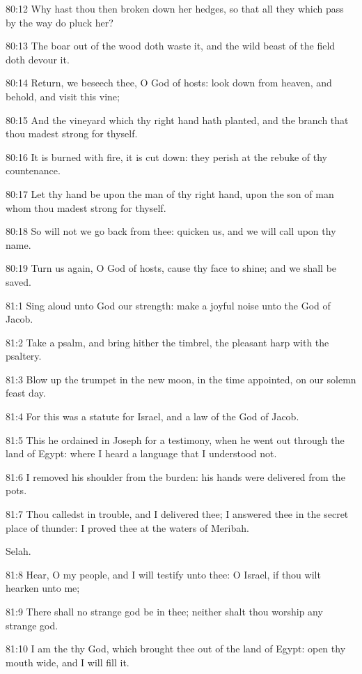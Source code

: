 80:12 Why hast thou then broken down her hedges, so that all they which pass by the way do pluck her?

80:13 The boar out of the wood doth waste it, and the wild beast of the field doth devour it.

80:14 Return, we beseech thee, O God of hosts: look down from heaven, and behold, and visit this vine;

80:15 And the vineyard which thy right hand hath planted, and the branch that thou madest strong for thyself.

80:16 It is burned with fire, it is cut down: they perish at the rebuke of thy countenance.

80:17 Let thy hand be upon the man of thy right hand, upon the son of man whom thou madest strong for thyself.

80:18 So will not we go back from thee: quicken us, and we will call upon thy name.

80:19 Turn us again, O \LORD God of hosts, cause thy face to shine; and we shall be saved.



81:1 Sing aloud unto God our strength: make a joyful noise unto the God of Jacob.

81:2 Take a psalm, and bring hither the timbrel, the pleasant harp with the psaltery.

81:3 Blow up the trumpet in the new moon, in the time appointed, on our solemn feast day.

81:4 For this was a statute for Israel, and a law of the God of Jacob.

81:5 This he ordained in Joseph for a testimony, when he went out through the land of Egypt: where I heard a language that I understood not.

81:6 I removed his shoulder from the burden: his hands were delivered from the pots.

81:7 Thou calledst in trouble, and I delivered thee; I answered thee in the secret place of thunder: I proved thee at the waters of Meribah.

Selah.

81:8 Hear, O my people, and I will testify unto thee: O Israel, if thou wilt hearken unto me;

81:9 There shall no strange god be in thee; neither shalt thou worship any strange god.

81:10 I am the \LORD thy God, which brought thee out of the land of Egypt: open thy mouth wide, and I will fill it.

